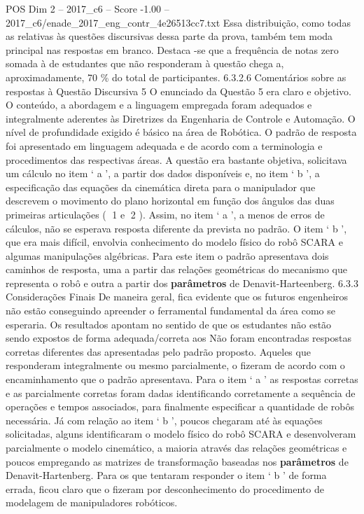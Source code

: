 \begin{textsample}{POS Dim 2 – 2017\_c6 – Score -1.00 – 2017\_c6/enade\_2017\_eng\_contr\_4e26513cc7.txt}
Essa distribuição, como todas as relativas às questões discursivas dessa parte da prova, também tem moda principal nas respostas em branco.
Destaca -se que a frequência de notas zero somada à de estudantes que não responderam à questão chega a, aproximadamente, 70 \% do total de participantes. 6.3.2.6 Comentários sobre as respostas à Questão Discursiva 5 O enunciado da Questão 5 era claro e objetivo.
O conteúdo, a abordagem e a linguagem empregada foram adequados e integralmente aderentes às Diretrizes da Engenharia de Controle e Automação.
O nível de profundidade exigido é básico na área de Robótica.
O padrão de resposta foi apresentado em linguagem adequada e de acordo com a terminologia e procedimentos das respectivas áreas.
A questão era bastante objetiva, solicitava um cálculo no item ‘ a ’, a partir dos dados disponíveis e, no item ‘ b ’, a especificação das equações da cinemática direta para o manipulador que descrevem o movimento do plano horizontal em função dos ângulos das duas primeiras articulações ( 1 e 2 ).
Assim, no item ‘ a ’, a menos de erros de cálculos, não se esperava resposta diferente da prevista no padrão.
O item ‘ b ’, que era mais difícil, envolvia conhecimento do modelo físico do robô SCARA e algumas manipulações algébricas.
Para este item o padrão apresentava dois caminhos de resposta, uma a partir das relações geométricas do mecanismo que representa o robô e outra a partir dos \textbf{parâmetros} de Denavit-Harteenberg. 6.3.3 Considerações Finais De maneira geral, fica evidente que os futuros engenheiros não estão conseguindo apreender o ferramental fundamental da área como se esperaria.
Os resultados apontam no sentido de que os estudantes não estão sendo expostos de forma adequada/correta aos Não foram encontradas respostas corretas diferentes das apresentadas pelo padrão proposto.
Aqueles que responderam integralmente ou mesmo parcialmente, o fizeram de acordo com o encaminhamento que o padrão apresentava.
Para o item ‘ a ’ as respostas corretas e as parcialmente corretas foram dadas identificando corretamente a sequência de operações e tempos associados, para finalmente especificar a quantidade de robôs necessária.
Já com relação ao item ‘ b ’, poucos chegaram até às equações solicitadas, alguns identificaram o modelo físico do robô SCARA e desenvolveram parcialmente o modelo cinemático, a maioria através das relações geométricas e poucos empregando as matrizes de transformação baseadas nos \textbf{parâmetros} de Denavit-Hartenberg.
Para os que tentaram responder o item ‘ b ’ de forma errada, ficou claro que o fizeram por desconhecimento do procedimento de modelagem de manipuladores robóticos.

\end{textsample}
